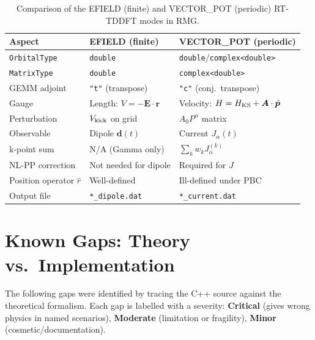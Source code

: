 \documentclass[12pt,letterpaper]{article}
\begin{document}
\begin{table}[ht]
\centering
\caption{Comparison of the EFIELD (finite) and VECTOR\_POT (periodic) RT-TDDFT
  modes in RMG\@.}
\label{tab:comparison}
\begin{tabular}{@{}lll@{}}
\toprule
Aspect & EFIELD (finite) & VECTOR\_POT (periodic) \\
\midrule
\texttt{OrbitalType} & \texttt{double} & \texttt{double}/\texttt{complex<double>} \\
\texttt{MatrixType} & \texttt{double} & \texttt{complex<double>} \\
GEMM adjoint & \texttt{"t"} (transpose) & \texttt{"c"} (conj.\ transpose) \\
Gauge & Length: $V=-\bm{E}\cdot\bm{r}$ & Velocity: $H=H_{\rm KS}+\bm{A}\cdot\hat{\bm{p}}$ \\
Perturbation & $V_{\rm kick}$ on grid & $A_0 P^\alpha$ matrix \\
Observable & Dipole $\bm{d}(t)$ & Current $J_\alpha(t)$ \\
k-point sum & N/A (Gamma only) & $\sum_k w_k J^{(k)}_\alpha$ \\
NL-PP correction & Not needed for dipole & Required for $J$ \\
Position operator $\hat{r}$ & Well-defined & Ill-defined under PBC \\
Output file & \texttt{*\_dipole.dat} & \texttt{*\_current.dat} \\
\bottomrule
\end{tabular}
\end{table}

\section{Known Gaps: Theory vs.\ Implementation}
\label{sec:gaps}

The following gaps were identified by tracing the C++ source against the
theoretical formalism.  Each gap is labelled with a severity:
\textbf{Critical} (gives wrong physics in named scenarios),
\textbf{Moderate} (limitation or fragility), \textbf{Minor} (cosmetic/documentation).
\end{document}
